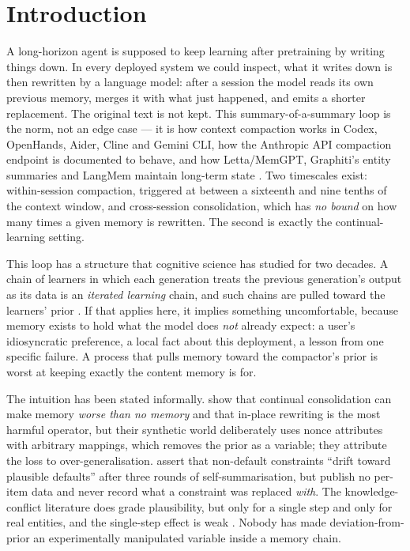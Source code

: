 \section{Introduction}

A long-horizon agent is supposed to keep learning after pretraining by writing things down. In every
deployed system we could inspect, what it writes down is then rewritten by a language model: after a
session the model reads its own previous memory, merges it with what just happened, and emits a
shorter replacement. The original text is not kept. This summary-of-a-summary loop is the norm, not
an edge case --- it is how context compaction works in Codex, OpenHands, Aider, Cline and Gemini
CLI, how the Anthropic API compaction endpoint is documented to behave, and how Letta/MemGPT,
Graphiti's entity summaries and LangMem maintain long-term state \citep{packer2024memgpt}. Two
timescales exist: within-session compaction, triggered at between a sixteenth and nine tenths of the
context window, and cross-session consolidation, which has \emph{no bound} on how many times a given
memory is rewritten. The second is exactly the continual-learning setting.

This loop has a structure that cognitive science has studied for two decades. A chain of learners in
which each generation treats the previous generation's output as its data is an \emph{iterated
learning} chain, and such chains are pulled toward the learners' prior
\citep{griffiths2007language,kirby2007innateness}. If that applies here, it implies something
uncomfortable, because memory exists to hold what the model does \emph{not} already expect: a user's
idiosyncratic preference, a local fact about this deployment, a lesson from one specific failure. A
process that pulls memory toward the compactor's prior is worst at keeping exactly the content
memory is for.

The intuition has been stated informally. \citet{zhang2026faulty} show that continual consolidation
can make memory \emph{worse than no memory} and that in-place rewriting is the most harmful
operator, but their synthetic world deliberately uses nonce attributes with arbitrary mappings,
which removes the prior as a variable; they attribute the loss to over-generalisation.
\citet{zahn2026facts} assert that non-default constraints ``drift toward plausible defaults'' after
three rounds of self-summarisation, but publish no per-item data and never record what a constraint
was replaced \emph{with}. The knowledge-conflict literature does grade plausibility, but only for a
single step and only for real entities, and the single-step effect is weak
\citep{clasheval2024,kochelka2026weak}. Nobody has made deviation-from-prior an experimentally
manipulated variable inside a memory chain.

